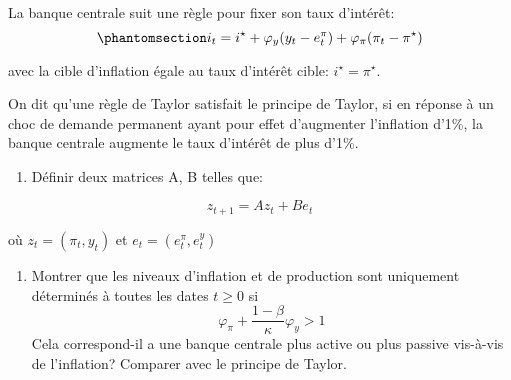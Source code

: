 \documentclass[
  letterpaper,
  DIV=11,
  numbers=noendperiod]{scrartcl}
\providecommand{\tightlist}{%
  \setlength{\itemsep}{0pt}\setlength{\parskip}{0pt}}\usepackage{longtable,booktabs,array}
\begin{document}
La banque centrale suit une règle pour fixer son taux d'intérêt:
\begin{equation}\phantomsection\label{eq-taylor}{i_t = i^{\star} + \varphi_y (y_t - e^{\pi}_t) + \varphi_\pi (\pi_t - \pi^{\star})}\end{equation}

avec la cible d'inflation égale au taux d'intérêt cible:
\(i^{\star}=\pi^{\star}\).

On dit qu'une règle de Taylor satisfait le principe de Taylor, si en
réponse à un choc de demande permanent ayant pour effet d'augmenter
l'inflation d'1\%, la banque centrale augmente le taux d'intérêt de plus
d'1\%.

\begin{enumerate}
\def\labelenumi{\arabic{enumi}.}
\tightlist
\item
  Définir deux matrices A, B telles que:
\end{enumerate}

\[z_{t+1} = A z_t + B e_t\]

où \(z_t=(\pi_t, y_t)\) et \(e_t = (e^{\pi}_t, e^{y}_t)\)

\begin{enumerate}
\def\labelenumi{\arabic{enumi}.}
\setcounter{enumi}{1}
\tightlist
\item
  Montrer que les niveaux d'inflation et de production sont uniquement
  déterminés à toutes les dates \(t\geq 0\) si
  \[\varphi_{\pi} + \frac{1-\beta}{\kappa} \varphi_{y}> 1\] Cela
  correspond-il a une banque centrale plus active ou plus passive
  vis-à-vis de l'inflation? Comparer avec le principe de Taylor.
\end{enumerate}
\end{document}
